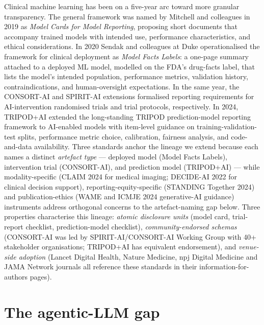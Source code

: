 \documentclass[11pt,a4paper]{article}
\begin{document}
Clinical machine learning has been on a five-year arc toward more granular transparency. The general framework was named by Mitchell and colleagues in 2019 as \emph{Model Cards for Model Reporting}\citep{mitchell2019}, proposing short documents that accompany trained models with intended use, performance characteristics, and ethical considerations. In 2020 Sendak and colleagues at Duke operationalised the framework for clinical deployment as \emph{Model Facts Labels}\citep{sendak2020}: a one-page summary attached to a deployed ML model, modelled on the FDA's drug-facts label, that lists the model's intended population, performance metrics, validation history, contraindications, and human-oversight expectations. In the same year, the CONSORT-AI and SPIRIT-AI extensions formalised reporting requirements for AI-intervention randomised trials and trial protocols, respectively\citep{consortAI2020}. In 2024, TRIPOD+AI\citep{tripodAI2024} extended the long-standing TRIPOD prediction-model reporting framework to AI-enabled models with item-level guidance on training-validation-test splits, performance metric choice, calibration, fairness analysis, and code-and-data availability. Three standards anchor the lineage we extend because each names a distinct \emph{artefact type} --- deployed model (Model Facts Labels), intervention trial (CONSORT-AI), and prediction model (TRIPOD+AI) --- while modality-specific (CLAIM 2024 for medical imaging; DECIDE-AI 2022 for clinical decision support), reporting-equity-specific (STANDING Together 2024) and publication-ethics (WAME and ICMJE 2024 generative-AI guidance) instruments address orthogonal concerns to the artefact-naming gap below. Three properties characterise this lineage: \emph{atomic disclosure units} (model card, trial-report checklist, prediction-model checklist), \emph{community-endorsed schemas} (CONSORT-AI was led by SPIRIT-AI/CONSORT-AI Working Group with 40+ stakeholder organisations; TRIPOD+AI has equivalent endorsement), and \emph{venue-side adoption} (Lancet Digital Health, Nature Medicine, npj Digital Medicine and JAMA Network journals all reference these standards in their information-for-authors pages).

\section{The agentic-LLM gap}
\end{document}
